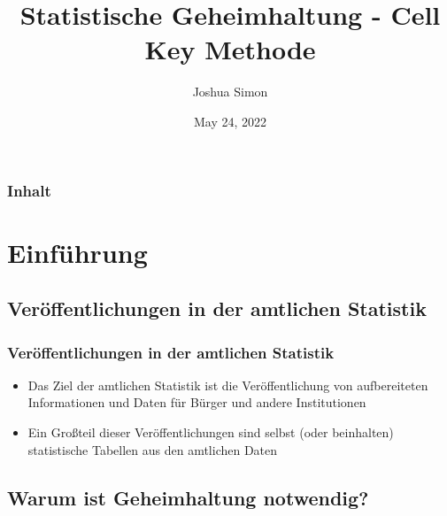 \documentclass[aspectratio=169]{beamer}
\title[Statistische Geheimhaltung]{Statistische Geheimhaltung - Cell Key Methode} %
\author{Joshua Simon} %
\institute[University Bamberg] %
{
Otto-Friedrich-University Bamberg \\ %
\medskip
\textit{joshua-guenter.simon@stud.uni-bamberg.de} %
}
\date{May 24, 2022} %
\begin{document}
\begin{frame}
\titlepage %
\end{frame}

\begin{frame}
\frametitle{Inhalt} %
\tableofcontents %
\end{frame}



\section{Einführung} 

\subsection{Veröffentlichungen in der amtlichen Statistik}

\begin{frame}{}
    \frametitle{Veröffentlichungen in der amtlichen Statistik}
    \begin{itemize}
        \item Das Ziel der amtlichen Statistik ist die Veröffentlichung von aufbereiteten Informationen und Daten für Bürger und andere Institutionen
        \item Ein Großteil dieser Veröffentlichungen sind selbst (oder beinhalten) statistische Tabellen aus den amtlichen Daten
    \end{itemize}
\end{frame}


\subsection{Warum ist Geheimhaltung notwendig?}
\end{document}

